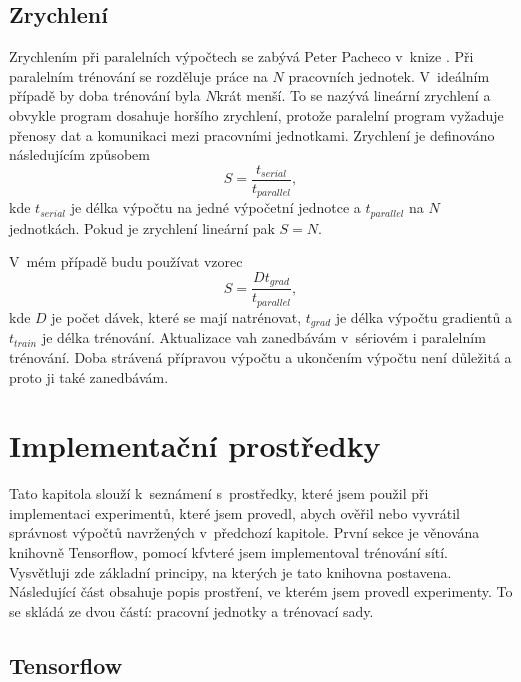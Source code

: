 \section{Zrychlení}
\label{sec:speedup}

Zrychlením při paralelních  výpočtech se zabývá Peter Pacheco v~knize \cite{Pacheco2011}.
Při paralelním trénování se rozděluje práce na $N$ pracovních jednotek.
V~ideálním případě by doba trénování byla $N$krát menší.
To se nazývá lineární zrychlení a obvykle program dosahuje horšího zrychlení, protože paralelní program vyžaduje přenosy dat a komunikaci mezi pracovními jednotkami.
Zrychlení je definováno následujícím způsobem \begin{equation}S=\frac{t_{serial}}{t_{parallel}},\end{equation} kde $t_{serial}$ je délka výpočtu na jedné výpočetní jednotce a $t_{parallel}$ na $N$ jednotkách.
Pokud je zrychlení lineární pak $S=N$.

V~mém případě budu používat vzorec \begin{equation}S=\frac{Dt_{grad}}{t_{parallel}},\end{equation} kde $D$ je počet dávek, které se mají natrénovat, $t_{grad}$ je délka výpočtu gradientů a $t_{train}$ je délka trénování.
Aktualizace vah zanedbávám v~sériovém i paralelním trénování.
Doba strávená přípravou výpočtu a ukončením výpočtu není důležitá a proto ji také zanedbávám.


\chapter{Implementační prostředky}
\label{chap:impl}

Tato kapitola slouží k~seznámení s~prostředky, které jsem použil při implementaci experimentů, které jsem provedl, abych ověřil nebo vyvrátil správnost výpočtů navržených v~předchozí kapitole.
První sekce je věnována knihovně Tensorflow, pomocí kfvteré jsem implementoval trénování sítí.
Vysvětluji zde základní principy, na kterých je tato knihovna postavena.
Následující část obsahuje popis prostření, ve kterém jsem provedl experimenty.
To se skládá ze dvou částí: pracovní jednotky a trénovací sady.

\section{Tensorflow}
\label{sec:tf}

